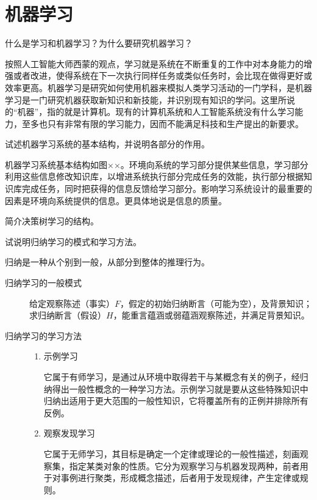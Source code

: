 \chapter{机器学习}

\begin{question}
什么是学习和机器学习？为什么要研究机器学习？
\end{question}
\begin{solution}
按照人工智能大师西蒙的观点，学习就是系统在不断重复的工作中对本身能力的增强或者改进，使得系统在下一次执行同样任务或类似任务时，会比现在做得更好或效率更高。机器学习是研究如何使用机器来模拟人类学习活动的一门学科，是机器学习是一门研究机器获取新知识和新技能，并识别现有知识的学问。这里所说的“机器”，指的就是计算机。现有的计算机系统和人工智能系统没有什么学习能力，至多也只有非常有限的学习能力，因而不能满足科技和生产提出的新要求。 
\end{solution}

\begin{question}
试述机器学习系统的基本结构，并说明各部分的作用。
\end{question}
\begin{solution}
机器学习系统基本结构如图××。环境向系统的学习部分提供某些信息，学习部分利用这些信息修改知识库，以增进系统执行部分完成任务的效能，执行部分根据知识库完成任务，同时把获得的信息反馈给学习部分。影响学习系统设计的最重要的因素是环境向系统提供的信息。更具体地说是信息的质量。 
\end{solution}

\begin{question}
简介决策树学习的结构。
\end{question}
\begin{solution}
\end{solution}

\begin{question}
试说明归纳学习的模式和学习方法。
\end{question}
\begin{solution}
归纳是一种从个别到一般，从部分到整体的推理行为。
	\begin{description}
		\item[归纳学习的一般模式] 给定观察陈述（事实）$F$，假定的初始归纳断言（可能为空），及背景知识；求归纳断言（假设）$H$，能重言蕴涵或弱蕴涵观察陈述，并满足背景知识。 
		\item[归纳学习的学习方法] \quad
			\begin{enumerate}
				\item 示例学习 \par
				它属于有师学习，是通过从环境中取得若干与某概念有关的例子，经归纳得出一般性概念的一种学习方法。示例学习就是要从这些特殊知识中归纳出适用于更大范围的一般性知识，它将覆盖所有的正例并排除所有反例。
				\item 观察发现学习 \par
				它属于无师学习，其目标是确定一个定律或理论的一般性描述，刻画观察集，指定某类对象的性质。它分为观察学习与机器发现两种，前者用于对事例进行聚类，形成概念描述，后者用于发现规律，产生定律或规则。 
			\end{enumerate}
	\end{description}
\end{solution}

